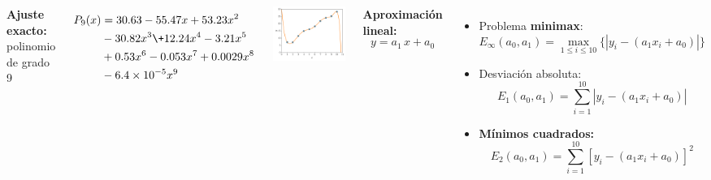 \documentclass[9pt, aspectratio=169]{beamer}
\begin{document}
\begin{frame}
	\begin{columns}[t]
		\textbf{Ajuste exacto:} polinomio de grado 9

		\begin{align*}
			P_{9}(x) & = 30.63 - 55.47 x + 53.23 x^2      \\
			         & - 30.82 x^3 \+ 12.24 x^4 -3.21 x^5 \\
			         & +0.53 x^6 - 0.053 x^7 + 0.0029 x^8 \\
			         & - 6.4 \times 10^{-5} x^9
		\end{align*}
		\begin{center}
			\includegraphics[scale=0.40]{figs/fig-02.pdf}
		\end{center} \pause

		\textbf{Aproximación lineal:}
		\[ y = a_1 \, x + a_0 \]

		\begin{itemize}
			\item  Problema \textbf{minimax}:
			      \[ E_{\infty}(a_0, a_1) = \max_{1 \leq i \leq 10} \{|y_i - (a_1 x_i + a_0)|\} \]  \pause
			\item Desviación absoluta:
			      \[ E_1(a_0, a_1) = \sum_{i = 1}^{10} |y_i - (a_1 x_i + a_0) | \] \pause
			\item \textbf{Mínimos cuadrados:}
			      \[ E_2(a_0, a_1) = \sum_{i = 1}^{10} [y_i - (a_1 x_i + a_0)]^2 \]
		\end{itemize}
	\end{columns}
\end{frame}
\end{document}
